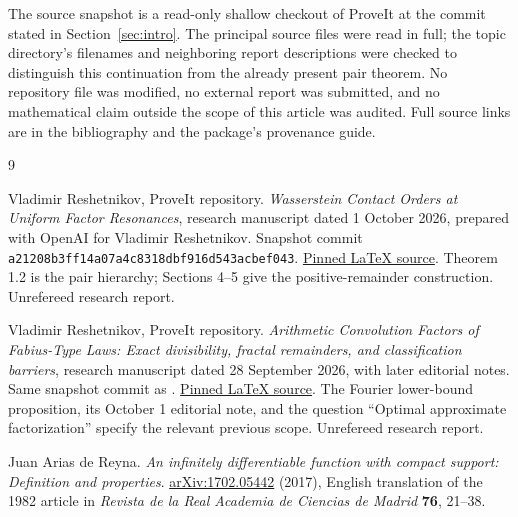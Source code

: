 \documentclass[11pt,letterpaper]{article}
\theoremstyle{definition}
\theoremstyle{remark}
\begin{document}
The source snapshot is a read-only shallow checkout of ProveIt at the commit stated in Section~\ref{sec:intro}. The principal source files were read in full; the topic directory's filenames and neighboring report descriptions were checked to distinguish this continuation from the already present pair theorem. No repository file was modified, no external report was submitted, and no mathematical claim outside the scope of this article was audited. Full source links are in the bibliography and the package's provenance guide.

\clearpage
\begin{thebibliography}{9}
\raggedright

Vladimir Reshetnikov, ProveIt repository.
\emph{Wasserstein Contact Orders at Uniform Factor Resonances}, research manuscript dated 1 October 2026, prepared with OpenAI for Vladimir Reshetnikov.
Snapshot commit \texttt{a21208b3ff14a07a4c8318dbf916d543acbef043}.
\href{https://github.com/VladimirReshetnikov/ProveIt/blob/a21208b3ff14a07a4c8318dbf916d543acbef043/Analysis/FabiusFunction/docs/semi-formalized-research-frontiers/drafts/spectra-and-arithmetic/Wasserstein_Contact_Orders_Uniform_Factor_Resonances/wasserstein-resonance.tex}{Pinned LaTeX source}.
Theorem 1.2 is the pair hierarchy; Sections 4--5 give the positive-remainder construction. Unrefereed research report.

Vladimir Reshetnikov, ProveIt repository.
\emph{Arithmetic Convolution Factors of Fabius-Type Laws: Exact divisibility, fractal remainders, and classification barriers}, research manuscript dated 28 September 2026, with later editorial notes.
Same snapshot commit as \cite{repo-contact}.
\href{https://github.com/VladimirReshetnikov/ProveIt/blob/a21208b3ff14a07a4c8318dbf916d543acbef043/Analysis/FabiusFunction/docs/semi-formalized-research-frontiers/drafts/spectra-and-arithmetic/Arithmetic_Convolution_Factors_Fabius_Type_Laws/article.tex}{Pinned LaTeX source}.
The Fourier lower-bound proposition, its October 1 editorial note, and the question ``Optimal approximate factorization'' specify the relevant previous scope. Unrefereed research report.

Juan Arias de Reyna.
\emph{An infinitely differentiable function with compact support: Definition and properties}.
\href{https://arxiv.org/abs/1702.05442}{arXiv:1702.05442} (2017), English translation of the 1982 article in \emph{Revista de la Real Academia de Ciencias de Madrid} \textbf{76}, 21--38.


\end{thebibliography}
\end{document}
